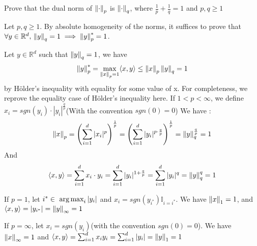 \begin{exercise}[]{}
	Prove that the dual norm of $ \left\|\cdot \right\|_p $ is $ \left\|\cdot \right\|_q $, where $ \frac{1}{p} + \frac{1}{q} = 1 $ and $ p,q \geq 1 $
\end{exercise}

\begin{solution}[]
	Let $ p,q \geq 1 $. By absolute homogeneity of the norms, it suffices to prove that $\forall y \in \mathbb{R}^d,\, \left\|y\right\|_q = 1 \implies \left\|y\right\|_p^{*} =1 $.

Let $ y \in \mathbb{R}^d $ such that $ \left\|y\right\|_q = 1 $, we have
\begin{equation*}
	\left\|y\right\|_p^{*} = \max_{\left\|x\right\|_p=1}\langle x,y\rangle \leq \left\|x\right\|_p \left\|y\right\|_q = 1
\end{equation*}
by Hölder's inequality with equality for some value of x. For completeness, we reprove the equality case of Hölder's inequality here. If $ 1<p<\infty $, we define $ x_i = sgn(y_i)\cdot |y_i|^{\frac{q}{p}} $(With the convention $ sgn(0) = 0 $)
We have :
\begin{equation*}
	\left\|x\right\|_p = \left( \sum_{i=1}^{d}|x_i|^p \right)^{\frac{1}{p}} = \left( \sum_{i=1}^{d}|y_i|^{p\cdot \frac{q}{p}} \right)^{\frac{1}{p}} = \left\|y\right\|_q^{\frac{q}{p}}=1
\end{equation*}
And
\begin{equation*}
	\langle x,y\rangle = \sum_{i=1}^{d}x_i\cdot y_i = \sum_{i=1}^{d}|y_i|^{1+\frac{q}{p}} = \sum_{i=1}^{d}|y_i|^q = \left\|y\right\|_q^q = 1
\end{equation*}

If $ p=1 $, let $ i^{*} \in \mathop{\mbox{ arg\,max}}_{i} |y_i| $ and $ x_i = sgn(y_{i^{*}})\mathbb{I}_{i=i^{*}} $. We have $ \left\|x\right\|_1 = 1 $, and $ \langle x,y\rangle = |y_{i^{*}}| = \left\|y\right\|_{\infty} =1 $

If $ p=\infty $, let $ x_i = sgn(y_i) $(with the convention $ sgn(0) = 0 $). We have $ \left\|x\right\|_{\infty} = 1 $ and $ \langle x,y\rangle = \sum_{i=1}^{d}x_i y_i = \sum_{i=1}^{d}|y_i| = \left\|y\right\|_1 = 1$


\end{solution}
